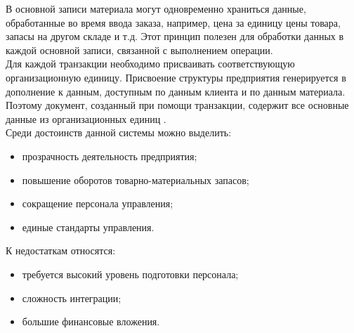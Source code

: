 В основной записи материала могут одновременно храниться данные, обработанные во время ввода заказа, например, цена за единицу цены товара, запасы на другом складе и т.д. 
Этот принцип полезен для обработки данных в каждой основной записи, связанной с выполнением операции.\\
\indent Для каждой транзакции необходимо присваивать соответствующую организационную единицу. 
Присвоение структуры предприятия генерируется в дополнение к данным, доступным по данным клиента и по данным материала. 
Поэтому документ, созданный при помощи транзакции, содержит все основные данные из организационных единиц \cite{gehBook}.\\
\indent Среди достоинств данной системы можно выделить:

\begin{itemize}
	\item прозрачность деятельность предприятия;
	\item повышение оборотов товарно-материальных запасов;
	\item сокращение персонала управления;
	\item единые стандарты управления.
\end{itemize}

\indent К недостаткам относятся:

\begin{itemize}
	\item требуется высокий уровень подготовки персонала;
	\item сложность интеграции;
	\item большие финансовые вложения.
\end{itemize}
